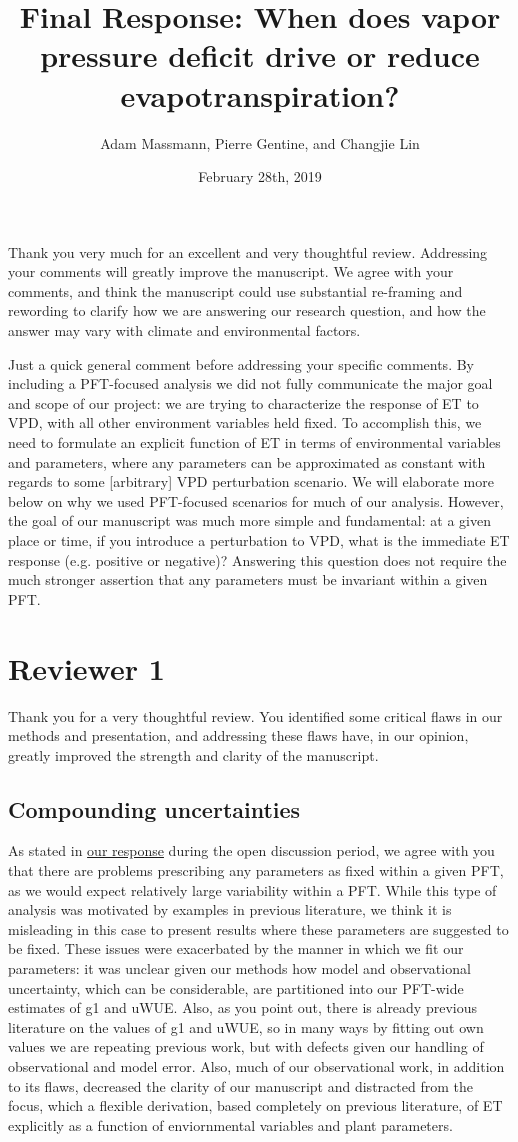 \documentclass[12pt]{article}
\title{Final Response: When does vapor pressure deficit drive or
  reduce evapotranspiration?}
\author{Adam Massmann, Pierre Gentine, and Changjie Lin}
\date{February 28th, 2019}
\begin{document}
Thank you very much for an excellent and very thoughtful
review. Addressing your comments will greatly improve the
manuscript. We agree with your comments, and think the manuscript
could use substantial re-framing and rewording to clarify how we are
answering our research question, and how the answer may vary with
climate and environmental factors.

Just a quick general comment before addressing your specific
comments. By including a PFT-focused analysis we did not fully
communicate the major goal and scope of our project: we are trying to
characterize the response of ET to VPD, with all other environment
variables held fixed. To accomplish this, we need to formulate an
explicit function of ET in terms of environmental variables and
parameters, where any parameters can be approximated as constant with
regards to some [arbitrary] VPD perturbation scenario. We will
elaborate more below on why we used PFT-focused scenarios for much of
our analysis. However, the goal of our manuscript was much more simple
and fundamental: at a given place or time, if you introduce a
perturbation to VPD, what is the immediate ET response (e.g. positive
or negative)? Answering this question does not require the much
stronger assertion that any parameters must be invariant within a
given PFT.

\section{Reviewer 1}

Thank you for a very thoughtful review. You identified some critical
flaws in our methods and presentation, and addressing these flaws
have, in our opinion, greatly improved the strength and clarity of the
manuscript.

\subsection{Compounding uncertainties}
\label{pft}
As stated in
\href{https://editor.copernicus.org/index.php/hess-2018-553-AC1.pdf}{our
response} during the open discussion period, we agree
with you that there are problems prescribing any parameters as fixed
within a given PFT, as we would expect relatively large variability
within a PFT. While this type of analysis was motivated by examples in
previous literature, we think it is misleading in this case to present
results where these parameters are suggested to be fixed. These issues
were exacerbated by the manner in which we fit our parameters: it was
unclear given our methods how model and observational uncertainty,
which can be considerable, are partitioned into our PFT-wide estimates
of g1 and uWUE. Also, as you point out, there is already previous
literature on the values of g1 and uWUE, so in many ways by fitting
out own values we are repeating previous work, but with defects given
our handling of observational and model error. Also, much of our
observational work, in addition to its flaws, decreased the clarity of
our manuscript and distracted from the focus, which a flexible
derivation, based completely on previous literature, of ET explicitly
as a function of enviornmental variables and plant parameters.
\end{document}
